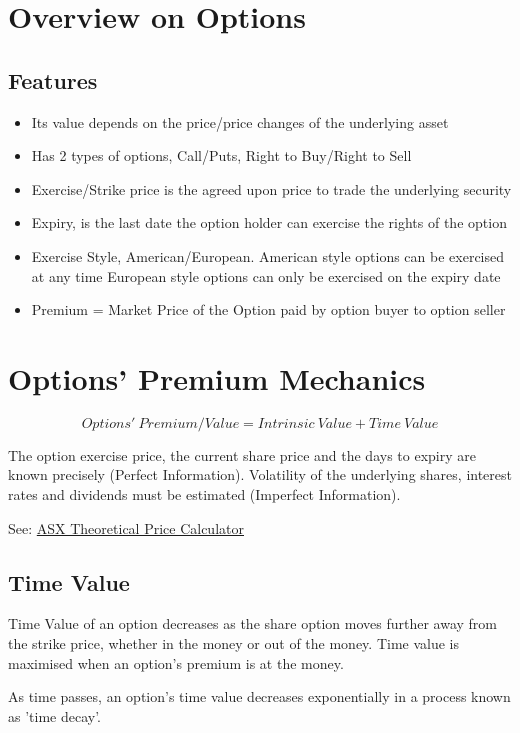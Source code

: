 \documentclass[12pt, a4paper]{article}
\begin{document}
\medskip

\section*{Overview on Options}
\subsection*{Features}
\begin{itemize}
    \item Its value depends on the price/price changes of the underlying asset
    \item Has 2 types of options, Call/Puts, Right to Buy/Right to Sell
    \item Exercise/Strike price is the agreed upon price to trade the underlying security
    \item Expiry, is the last date the option holder can exercise the rights of the option
    \item Exercise Style, American/European. American style options can be exercised at any time
          European style options can only be exercised on the expiry date
    \item Premium = Market Price of the Option paid by option buyer to option seller
\end{itemize}

\pagebreak
\section*{Options' Premium Mechanics}
$$ Options'\: Premium/Value = Intrinsic\: Value + Time\: Value $$

The option exercise price, the current share price and the days to expiry are known precisely (Perfect Information).
Volatility of the underlying shares, interest rates and dividends must be estimated  (Imperfect Information).

See: \href{https://www.asxoptions.com/price-calculator/}{ASX Theoretical Price Calculator}

\subsection*{Time Value}
Time Value of an option decreases as the share option moves further away from the strike price,
whether in the money or out of the money. Time value is maximised when an option's premium is
at the money.

As time passes, an option's time value decreases exponentially in a process known as 'time decay'.
\end{document}
